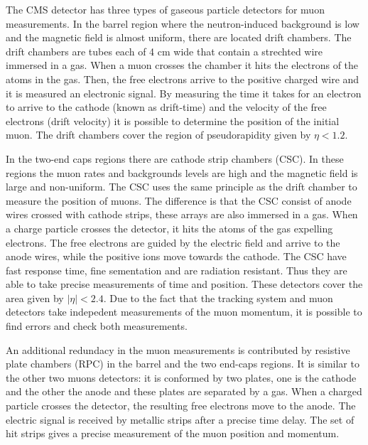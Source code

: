 The CMS detector has three types of gaseous particle detectors for muon measurements. In the barrel region where the neutron-induced background is low and the magnetic field is almost uniform, there are located drift chambers. The drift chambers are tubes each of 4 cm wide that contain a strechted wire immersed in a gas. When a muon crosses the chamber it hits the electrons of the atoms in the gas. Then, the free electrons arrive to the positive charged wire and it is measured an electronic signal. By measuring the time it takes for an electron to arrive to the cathode (known as drift-time) and the velocity of the free electrons (drift velocity) it is possible to determine the position of the initial muon. The drift chambers cover the region of pseudorapidity given by $\eta < 1.2$.
  
In the two-end caps regions there are cathode strip chambers (CSC). In these regions the muon rates and backgrounds levels are high and the magnetic field is large and non-uniform. The CSC uses the
same principle as the drift chamber to measure the position of muons. The difference is that the CSC consist of anode wires crossed with cathode strips, these arrays are also immersed in a gas. When
a charge particle crosses the detector, it hits the atoms of the gas expelling electrons. The free electrons are guided by the electric field and arrive to the anode wires, while the positive ions 
move towards the cathode. The CSC have fast response time, fine sementation and are radiation resistant. Thus they are able to take precise measurements of time and position. These detectors cover the
area given by $|\eta| < 2.4$. Due to the fact that the tracking system and muon detectors take indepedent measurements of the muon momentum, it is possible to find errors and check both measurements.


An additional redundacy in the muon measurements is contributed by resistive plate chambers (RPC) in the barrel and the two end-caps regions. It is similar to the other two muons detectors: it is 
conformed by two plates, one is the cathode and the other the anode and these plates are separated by a gas. When a charged particle crosses the detector, the resulting free electrons move to the anode.
The electric signal is received by metallic strips after a precise time delay. The set of hit strips gives a precise measurement of the muon position and momentum.

